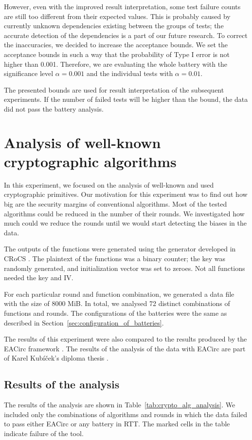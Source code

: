 \documentclass[
  digital,  	%
  color,		%
  oneside,   	%
  12pt,
  nocover,
  notable,
  nolof,
  nolot,
]{fithesis3}
\theoremstyle{definition}
\theoremstyle{remark}
\begin{document}
However, even with the improved result interpretation, some test failure counts are still too different from their expected values. This is probably caused by currently unknown dependencies existing between the groups of tests; the accurate detection of the dependencies is a part of our future research. To correct the inaccuracies, we decided to increase the acceptance bounds. We set the acceptance bounds in such a way that the probability of Type I error is not higher than 0.001. Therefore, we are evaluating the whole battery with the significance level $\alpha=0.001$ and the individual tests with $\alpha=0.01$.

The presented bounds are used for result interpretation of the subsequent experiments. If the number of failed tests will be higher than the bound, the data did not pass the battery analysis.

\section{Analysis of well-known cryptographic algorithms}
In this experiment, we focused on the analysis of well-known and used cryptographic primitives. Our motivation for this experiment was to find out how big are the security margins of conventional algorithms. Most of the tested algorithms could be reduced in the number of their rounds. We investigated how much could we reduce the rounds until we would start detecting the biases in the data.

The outputs of the functions were generated using the generator developed in CRoCS \cite{eacirc-streams}. The plaintext of the functions was a binary counter; the key was randomly generated, and initialization vector was set to zeroes. Not all functions needed the key and IV. 

For each particular round and function combination, we generated a data file with the size of 8000 MiB. In total,  we analysed 72 distinct combinations of functions and rounds. The configurations of the batteries were the same as described in Section~\ref{sec:configuration_of_batteries}. 

The results of this experiment were also compared to the results produced by the EACirc framework \cite{eacirc-github}. The results of the analysis of the data with EACirc are part of Karel Kubíček's diploma thesis \cite{kubicek-dp}.

\subsection{Results of the analysis}
The results of the analysis are shown in Table~\ref{tab:crypto_alg_analysis}. We included only the combinations of algorithms and rounds in which the data failed to pass either EACirc or any battery in RTT. The marked cells in the table indicate failure of the tool. 
\end{document}
